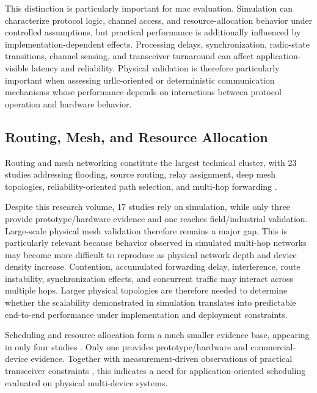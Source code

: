 \documentclass[conference]{IEEEtran}
\begin{document}
This distinction is particularly important for \gls{mac} evaluation.
Simulation can characterize protocol logic, channel access, and
resource-allocation behavior under controlled assumptions, but
practical performance is additionally influenced by
implementation-dependent effects. Processing delays, synchronization,
radio-state transitions, channel sensing, and transceiver turnaround
can affect application-visible latency and reliability. Physical
validation is therefore particularly important when assessing
\gls{urllc}-oriented or deterministic communication mechanisms whose
performance depends on interactions between protocol operation and
hardware behavior.


\subsection{Routing, Mesh, and Resource Allocation}
\label{subsec:routing_resources}

Routing and mesh networking constitute the largest technical cluster,
with 23 studies addressing flooding, source routing, relay assignment,
deep mesh topologies, reliability-oriented path selection, and
multi-hop forwarding
\cite{soniPerformanceMultihopAssisted2021,
kovalchukovDECT2020NewRadio2022,
biswasReliableLowLatencyCommunications2024,
fuhrlingRobustRoutingProtocol2025b,
asifURLLCBasedMultiHopCommunication2025,
glazkovImprovingNearURLLCServices2025,
samuylovPerformanceDECT2020NR2025,
alamDLRoutingPerformance2026a,
morozovaComparisonTwoModels2026a,
nikolaevModelingDECT2020Tandem2026,
rauwolfTopologyAwareDeepReinforcement2026a}.

Despite this research volume, 17 studies rely on simulation, while
only three provide prototype/hardware evidence and one reaches
field/industrial validation. Large-scale physical mesh validation
therefore remains a major gap. This is particularly relevant because
behavior observed in simulated multi-hop networks may become more
difficult to reproduce as physical network depth and device density
increase. Contention, accumulated forwarding delay, interference,
route instability, synchronization effects, and concurrent traffic
may interact across multiple hops. Larger physical topologies are
therefore needed to determine whether the scalability demonstrated in
simulation translates into predictable end-to-end performance under
implementation and deployment constraints.

Scheduling and resource allocation form a much smaller evidence base,
appearing in only four studies
\cite{samuylovPerformanceAssessmentDECT20202023,
binasifIRSAssistedDECT2020NR2025,
rauwolfTopologyAwareDeepReinforcement2026a,
grafParetoOptimalityApproach2026a}.
Only one provides prototype/hardware and commercial-device evidence.
Together with measurement-driven observations of practical
transceiver constraints
\cite{alizaiMeasurementDrivenLatencyAnalysis2026}, this indicates a
need for application-oriented scheduling evaluated on physical
multi-device systems.
\end{document}
